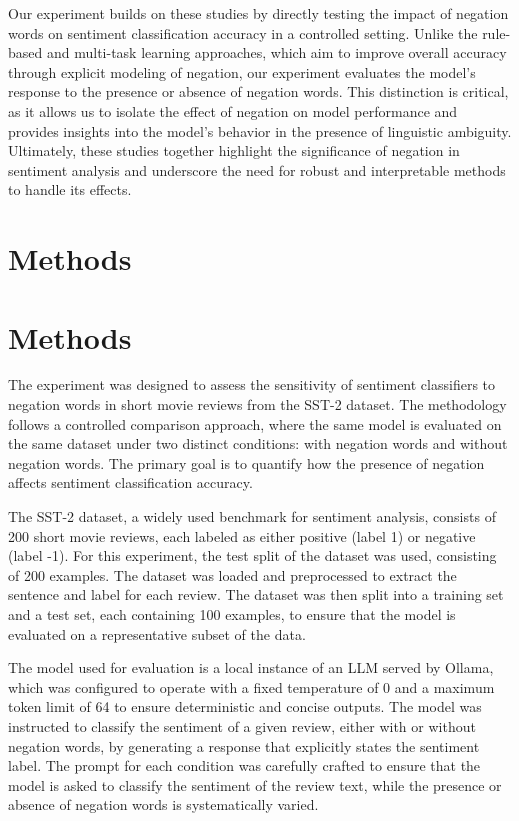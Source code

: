 \documentclass{article}
\begin{document}
Our experiment builds on these studies by directly testing the impact of negation words on sentiment classification accuracy in a controlled setting. Unlike the rule-based and multi-task learning approaches, which aim to improve overall accuracy through explicit modeling of negation, our experiment evaluates the model's response to the presence or absence of negation words. This distinction is critical, as it allows us to isolate the effect of negation on model performance and provides insights into the model's behavior in the presence of linguistic ambiguity. Ultimately, these studies together highlight the significance of negation in sentiment analysis and underscore the need for robust and interpretable methods to handle its effects.
\section{Methods}
\section{Methods}

The experiment was designed to assess the sensitivity of sentiment classifiers to negation words in short movie reviews from the SST-2 dataset. The methodology follows a controlled comparison approach, where the same model is evaluated on the same dataset under two distinct conditions: with negation words and without negation words. The primary goal is to quantify how the presence of negation affects sentiment classification accuracy.

The SST-2 dataset, a widely used benchmark for sentiment analysis, consists of 200 short movie reviews, each labeled as either positive (label 1) or negative (label -1). For this experiment, the test split of the dataset was used, consisting of 200 examples. The dataset was loaded and preprocessed to extract the sentence and label for each review. The dataset was then split into a training set and a test set, each containing 100 examples, to ensure that the model is evaluated on a representative subset of the data.

The model used for evaluation is a local instance of an LLM served by Ollama, which was configured to operate with a fixed temperature of 0 and a maximum token limit of 64 to ensure deterministic and concise outputs. The model was instructed to classify the sentiment of a given review, either with or without negation words, by generating a response that explicitly states the sentiment label. The prompt for each condition was carefully crafted to ensure that the model is asked to classify the sentiment of the review text, while the presence or absence of negation words is systematically varied.
\end{document}
